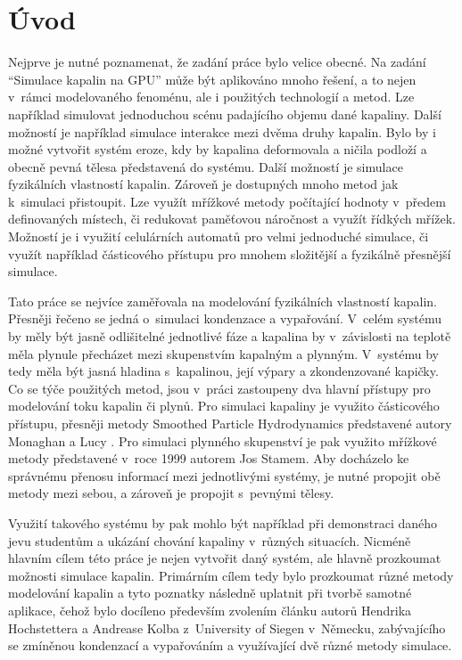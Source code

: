 \chapter{Úvod}
\label{chapter:uvod}
Nejprve je nutné poznamenat, že zadání práce bylo velice obecné. Na zadání \enquote{Simulace kapalin na GPU} může být aplikováno mnoho řešení, a to nejen v~rámci modelovaného fenoménu, ale i použitých technologií a metod. Lze například simulovat jednoduchou scénu padajícího objemu dané kapaliny. Další možností je například simulace interakce mezi dvěma druhy kapalin. Bylo by i možné vytvořit systém eroze, kdy by kapalina deformovala a ničila podloží a obecně pevná tělesa představená do systému. Další možností je simulace fyzikálních vlastností kapalin. Zároveň je dostupných mnoho metod jak k~simulaci přistoupit. Lze využít mřížkové metody počítající hodnoty v~předem definovaných místech, či redukovat paměťovou náročnost a využít řídkých mřížek. Možností je i využití celulárních automatů pro velmi jednoduché simulace, či využít například částicového přístupu pro mnohem složitější a fyzikálně přesnější simulace.

Tato práce se nejvíce zaměřovala na modelování fyzikálních vlastností kapalin. Přesněji řečeno se jedná o~simulaci kondenzace a vypařování. V~celém systému by měly být jasně odlišitelné jednotlivé fáze a kapalina by v~závislosti na teplotě měla plynule přecházet mezi skupenstvím kapalným a plynným. V~systému by tedy měla být jasná hladina s~kapalinou, její výpary a zkondenzované kapičky. Co se týče použitých metod, jsou v~práci zastoupeny dva hlavní přístupy pro modelování toku kapalin či plynů. Pro simulaci kapaliny je využito částicového přístupu, přesněji metody Smoothed Particle Hydrodynamics představené autory Monaghan \cite{Monaghan77} a Lucy \cite{Lucy77}. Pro simulaci plynného skupenství je pak využito mřížkové metody představené v~roce 1999 autorem Jos Stamem. \cite{Stam99} Aby docházelo ke správnému přenosu informací mezi jednotlivými systémy, je nutné propojit obě metody mezi sebou, a zároveň je propojit s~pevnými tělesy.

Využití takového systému by pak mohlo být například při demonstraci daného jevu studentům a ukázání chování kapaliny v~různých situacích. Nicméně hlavním cílem této práce je nejen vytvořit daný systém, ale hlavně prozkoumat možnosti simulace kapalin. Primárním cílem tedy bylo prozkoumat různé metody modelování kapalin a tyto poznatky následně uplatnit při tvorbě samotné aplikace, čehož bylo docíleno především zvolením článku \cite{Evap&Cond} autorů Hendrika Hochstettera a Andrease Kolba z~University of Siegen v~Německu, zabývajícího se zmíněnou kondenzací a vypařováním a využívající dvě různé metody simulace. 


